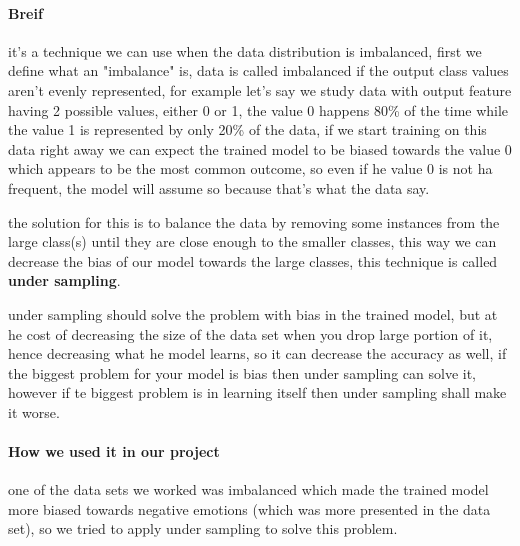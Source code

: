\paragraph{Breif}
it's a technique we can use when the data distribution is imbalanced, first we define what an "imbalance" is, data is called imbalanced if the output class values aren't evenly represented, for example let's say we study data with output feature having 2 possible values, either 0 or 1, the value 0 happens 80\% of the time while the value 1 is represented by only 20\% of the data, if we start training on this data right away we can expect the trained model to be biased towards the value 0 which appears to be the most common outcome, so even if he value 0 is not ha frequent, the model will assume so because that's what the data say. \newline

the solution for this is to balance the data by removing some instances from the large class(s) until they are close enough to the smaller classes, this way we can decrease the bias of our model towards the large classes, this technique is called \textbf{under sampling}. \newline 

under sampling should solve the problem with bias in the trained model, but at he cost of decreasing the size of the data set when you drop large portion of it, hence decreasing what he model learns, so it can decrease the accuracy as well, if the biggest problem for your model is bias then under sampling can solve it, however if te biggest problem is in learning itself then under sampling shall make it worse.

\paragraph{How we used it in our project}
one of the data sets we worked was imbalanced which made the trained model more biased towards negative emotions (which was more presented in the data set), so we tried to apply under sampling to solve this problem. \newline

